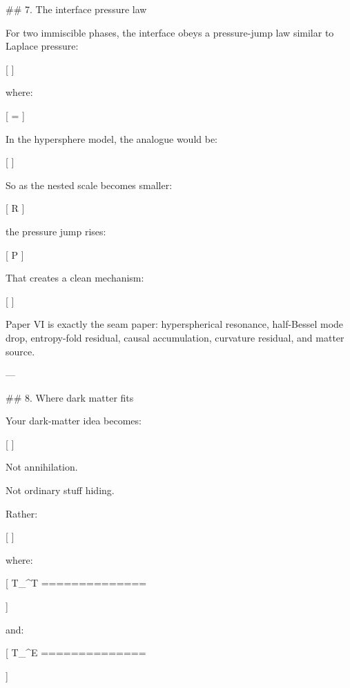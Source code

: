 ## 7. The interface pressure law

For two immiscible phases, the interface obeys a pressure-jump law similar to Laplace pressure:

[
]

where:

[
\sigma=
]

In the hypersphere model, the analogue would be:

[
]

So as the nested scale becomes smaller:

[
R\downarrow
]

the pressure jump rises:

[
\Delta P\uparrow
]

That creates a clean mechanism:

[
]

Paper VI is exactly the seam paper: hyperspherical resonance, half-Bessel mode drop, entropy-fold residual, causal accumulation, curvature residual, and matter source. 

---

## 8. Where dark matter fits

Your dark-matter idea becomes:

[
]

Not annihilation.

Not ordinary stuff hiding.

Rather:

[
]

where:

[
T_{\mu\nu}^{T}
==============

]

and:

[
T_{\mu\nu}^{E}
==============

]

